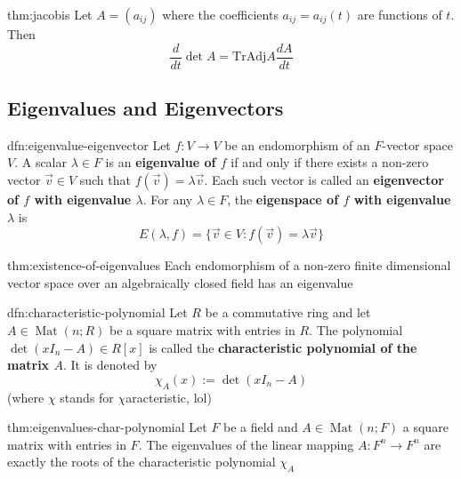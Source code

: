 \documentclass[landscape, 8pt]{extarticle}
\DeclareMathOperator{\Mat}{Mat}
\begin{document}
\begin{multicols}{3}
\begin{thm}{thm:jacobis}{}
    Let $A = (a_{ij})$ where the coefficients $a_{ij} = a_{ij}(t)$ are functions of $t$. Then
    \[\frac{d}{dt} \det A = \text{Tr}\text{Adj} A \frac{dA}{dt}\]
\end{thm}

\subsection{Eigenvalues and Eigenvectors}

\begin{dfn}{dfn:eigenvalue-eigenvector}{}
    Let $f: V \to V $ be an endomorphism of an $F$-vector space $V$. A scalar $\lambda\in F$ is an \textbf{eigenvalue of $f$} if and only if there exists a non-zero vector $\vec{v}\in V$ such that $f(\vec{v}) = \lambda \vec{v}$. Each such vector is called an \textbf{eigenvector of $f$ with eigenvalue $\lambda$}. For any $\lambda\in F$, the \textbf{eigenspace of $f$ with eigenvalue $\lambda$} is
    \[E(\lambda, f) = \{\vec{v}\in V : f(\vec{v}) = \lambda \vec{v}\}\]
\end{dfn}

\begin{thm}{thm:existence-of-eigenvalues}{}
    Each endomorphism of a non-zero finite dimensional vector space over an algebraically closed field has an eigenvalue
\end{thm}

\begin{dfn}{dfn:characteristic-polynomial}{}
    Let $R$ be a commutative ring and let $A\in \Mat(n;R)$ be a square matrix with entries in $R$. The polynomial $\det(x I_{n} - A)\in R[x]$ is called the \textbf{characteristic polynomial of the matrix $A$}. It is denoted by
    \[\chi_{A}(x) := \det(x I_{n} - A)\]
    (where $\chi$ stands for $\chi$aracteristic, lol)
\end{dfn}

\begin{thm}{thm:eigenvalues-char-polynomial}{}
    Let $F$ be a field and $A\in \Mat(n;F)$ a square matrix with entries in $F$. The eigenvalues of the linear mapping $A : F^{n}\to F^{n}$ are exactly the roots of the characteristic polynomial $\chi_{A}$
\end{thm}


\end{multicols}
\end{document}

